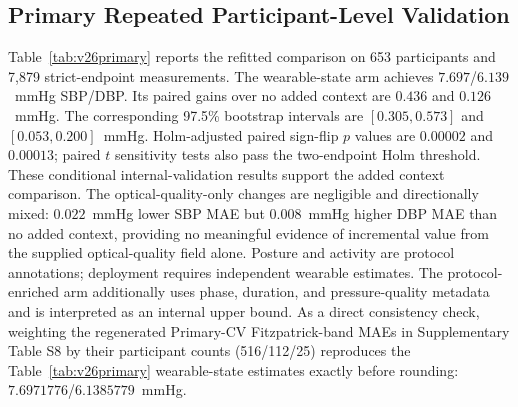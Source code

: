\documentclass[journal]{IEEEtran}
\begin{document}
\subsection{Primary Repeated Participant-Level Validation}
\label{sec:v26primary}
Table~\ref{tab:v26primary} reports the refitted comparison on 653 participants and 7,879 strict-endpoint measurements. The wearable-state arm achieves $7.697$/$6.139$~mmHg SBP/DBP. Its paired gains over no added context are $0.436$ and $0.126$~mmHg. The corresponding 97.5\% bootstrap intervals are $[0.305, 0.573]$ and $[0.053, 0.200]$~mmHg. Holm-adjusted paired sign-flip $p$ values are $0.00002$ and $0.00013$; paired $t$ sensitivity tests also pass the two-endpoint Holm threshold. These conditional internal-validation results support the added context comparison. The optical-quality-only changes are negligible and directionally mixed: $0.022$~mmHg lower SBP MAE but $0.008$~mmHg higher DBP MAE than no added context, providing no meaningful evidence of incremental value from the supplied optical-quality field alone. Posture and activity are protocol annotations; deployment requires independent wearable estimates. The protocol-enriched arm additionally uses phase, duration, and pressure-quality metadata and is interpreted as an internal upper bound. As a direct consistency check, weighting the regenerated Primary-CV Fitzpatrick-band MAEs in Supplementary Table S8 by their participant counts (516/112/25) reproduces the Table~\ref{tab:v26primary} wearable-state estimates exactly before rounding: $7.6971776$/$6.1385779$~mmHg.
\begin{table}[t]
\centering
\caption{Refitted Repeated Participant-Level Validation (653 Participants; Three-Reading Anchor)}
\label{tab:v26primary}
\scriptsize
{}
\end{table}
\end{document}
